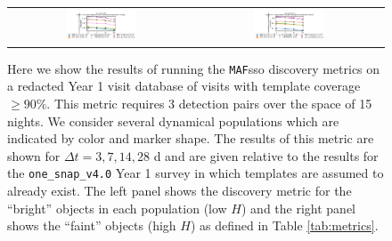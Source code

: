 \documentclass[preprintm,linenumbers]{aastex631}
\newcommand{\baseline}{\texttt{one\_snap\_v4.0}\xspace}
\newcommand{\maf}{\texttt{MAF}\xspace}
\begin{document}
		\begin{figure}
			\centering
			\begin{tabular}{c c}
				\includegraphics[width=0.4\textwidth]{results/one_snap_v4_0_n_visits_4_discovery_metric_bright.pdf} &
				\includegraphics[width=0.4\textwidth]{results/one_snap_v4_0_n_visits_4_discovery_metric_faint.pdf} \\
    			
			\end{tabular}
			\caption{Here we show the results of running the \maf \gls*{sso} discovery metrics on a redacted Year 1 visit database of visits with template coverage $\geq 90\%$.
				This metric requires 3 detection pairs over the space of 15 nights.
    We consider several dynamical populations which are indicated by color and marker shape.
				The results of this metric are shown for $\Delta t = 3, 7, 14, 28$ d and are given relative to the results for the \baseline Year 1 survey in which templates are assumed to already exist.
				The left panel shows the discovery metric for the ``bright'' objects in each population (low $H$) and the right panel shows the ``faint'' objects (high $H$) as defined in Table \ref{tab:metrics}.
			}
			\label{fig:temp_gen_discovery_metrics}
		\end{figure}
\end{document}
